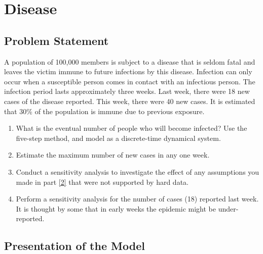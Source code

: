 \documentclass[12pt]{report}
\begin{document}
\chapter{Disease}

\section{Problem Statement}
A population of 100,000 members is subject to a disease that is seldom fatal and leaves the victim immune to future infections by this disease. Infection can only occur when a susceptible person comes in contact with an infectious person. The infection period lasts approximately three weeks. Last week, there were 18 new cases of the disease reported. This week, there were 40 new cases. It is estimated that 30\% of the population is immune due to previous exposure.

\begin{enumerate}[label=(\alph*),ref=(\alph*)]
    \item \label{2} What is the eventual number of people who will become infected? Use the five-step method, and model as a discrete-time dynamical system.
    \item Estimate the maximum number of new cases in any one week.
    \item Conduct a sensitivity analysis to investigate the effect of any assumptions you made in part \ref{2} that were not supported by hard data.
    \item Perform a sensitivity analysis for the number of cases (18) reported last week. It is thought by some that in early weeks the epidemic might be under-reported.
\end{enumerate}

\section{Presentation of the Model}
\end{document}
